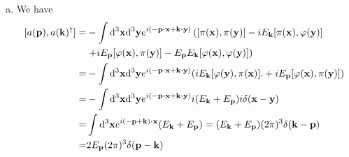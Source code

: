 \documentclass{article}
\begin{document}
\begin{enumerate}[a)]
\item We have
\begin{equation}
\begin{aligned}
[a(\vb{p}),a(\vb{k})^{\dagger}]=&-\int\dd[3]\vb{x}\dd[3]\vb{y}e^{i(-\vb{p}\vdot\vb{x}+\vb{k}\vdot\vb{y})}\left([\pi(\vb{x}),\pi(\vb{y})]-iE_{\vb{k}}[\pi(\vb{x}),\varphi(\vb{y})]\right.\\
&\left.+iE_{\vb{p}}[\varphi(\vb{x}),\pi(\vb{y})]-E_{\vb{p}}E_{\vb{k}}[\varphi(\vb{x}),\varphi(\vb{y})]\right)\\
=&-\int\dd[3]\vb{x}\dd[3]\vb{y}e^{i(-\vb{p}\vdot\vb{x}+\vb{k}\vdot\vb{y})}\qty(iE_{\vb{k}}[\varphi(\vb{y}),\pi(\vb{x})].+iE_{\vb{p}}[\varphi(\vb{x}),\pi(\vb{y})])\\
=&-\int\dd[3]\vb{x}\dd[3]\vb{y}e^{i(-\vb{p}\vdot\vb{x}+\vb{k}\vdot\vb{y})}i\qty(E_{\vb{k}}+E_{\vb{p}})i\delta(\vb{x}-\vb{y})\\
=&\int\dd[3]\vb{x}e^{i(-\vb{p}+\vb{k})\vdot\vb{x}}\qty(E_{\vb{k}}+E_{\vb{p}})=(E_{\vb{k}}+E_{\vb{p}})(2\pi)^3\delta(\vb{k}-\vb{p})\\
=&2E_{\vb{p}}(2\pi)^3\delta(\vb{p}-\vb{k})\\
\end{aligned}
\end{equation}

\end{enumerate}
\end{document}
